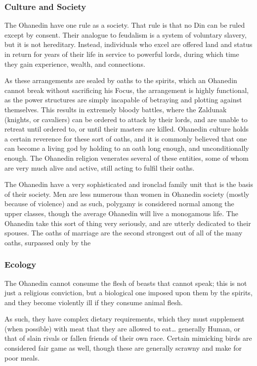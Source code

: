 \documentclass[oneside,11pt,english]{book}
\begin{document}
\subsubsection*{Culture and Society} 
The Ohanedin have one rule as a society. That rule is that no Din can be ruled except by consent. Their 
analogue to feudalism is a system of voluntary slavery, but it is not hereditary. Instead, individuals who 
excel are offered land and status in return for years of their life in service to powerful lords, during which 
time they gain experience, wealth, and connections. 


As these arrangements are sealed by oaths to the spirits, which an Ohanedin cannot break without 
sacrificing his Focus, the arrangement is highly functional, as the power structures are simply incapable 
of betraying and plotting against themselves. This results in extremely bloody battles, where the Zaldunak 
(knights, or cavaliers) can be ordered to attack by their lords, and are unable to retreat until ordered to, or 
until their masters are killed. Ohanedin culture holds a certain reverence for these sort of oaths, and it is 
commonly believed that one can become a living god by holding to an oath long enough, and 
unconditionally enough. The Ohanedin religion venerates several of these entities, some of whom are 
very much alive and active, still acting to fulfil their oaths. 


The Ohanedin have a very sophisticated and ironclad family unit that is the basis of their society. Men are 
less numerous than women in Ohanedin society (mostly because of violence) and as such, polygamy is 
considered normal among the upper classes, though the average Ohanedin will live a monogamous life. 
The Ohanedin take this sort of thing very seriously, and are utterly dedicated to their spouses. The oaths 
of marriage are the second strongest out of all of the many oaths, surpassed only by the 


\subsubsection*{Ecology} 
The Ohanedin cannot consume the flesh of beasts that cannot speak; this is not just a religious conviction, 
but a biological one imposed upon them by the spirits, and they become violently ill if they consume animal flesh. 


As such, they have complex dietary requirements, which they must supplement (when possible) with meat 
that they are allowed to eat… generally Human, or that of slain rivals or fallen friends of their own race. 
Certain mimicking birds are considered fair game as well, though these are generally scrawny and make 
for poor meals. 
\end{document}

